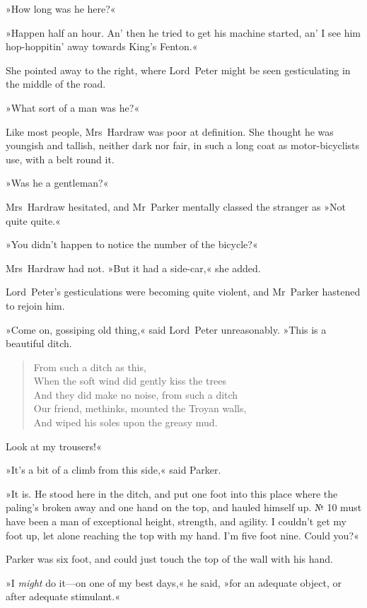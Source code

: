 »How long was he here?«

»Happen half an hour. An' then he tried to get his machine started, an' I see him hop-hoppitin' away towards King's Fenton.«

She pointed away to the right, where Lord~Peter might be seen gesticulating in the middle of the road.

»What sort of a man was he?«

Like most people, Mrs~Hardraw was poor at definition. She thought he was youngish and tallish, neither dark nor fair, in such a long coat as motor-bicyclists use, with a belt round it.

»Was he a gentleman?«

Mrs~Hardraw hesitated, and Mr~Parker mentally classed the stranger as »Not quite quite.«

»You didn't happen to notice the number of the bicycle?«

Mrs~Hardraw had not. »But it had a side-car,« she added.

Lord~Peter's gesticulations were becoming quite violent, and Mr~Parker hastened to rejoin him.

»Come on, gossiping old thing,« said Lord~Peter unreasonably. »This is a beautiful ditch.

\begin{verse}
From such a ditch as this,\\
When the soft wind did gently kiss the trees\\
And they did make no noise, from such a ditch\\
Our friend, methinks, mounted the Troyan walls,\\
And wiped his soles upon the greasy mud.\\
\end{verse}

Look at my trousers!«

»It's a bit of a climb from this side,« said Parker.

»It is. He stood here in the ditch, and put one foot into this place where the paling's broken away and one hand on the top, and hauled himself up. № 10 must have been a man of exceptional height, strength, and agility. I couldn't get my foot up, let alone reaching the top with my hand. I'm five foot nine. Could you?«

Parker was six foot, and could just touch the top of the wall with his hand.

»I \textit{might} do it—on one of my best days,« he said, »for an adequate object, or after adequate stimulant.«

